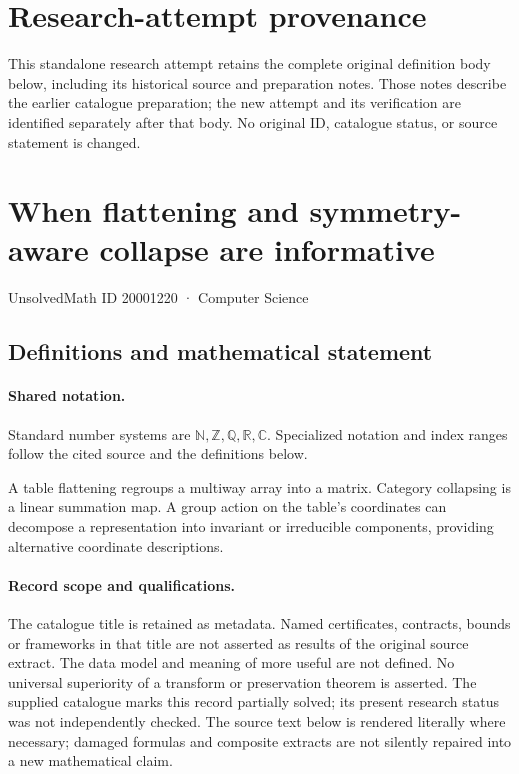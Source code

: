\documentclass[11pt]{article}
\begin{document}
\section*{Research-attempt provenance}
This standalone research attempt retains the complete original definition body below,
including its historical source and preparation notes. Those notes describe the
earlier catalogue preparation; the new attempt and its verification are identified
separately after that body. No original ID, catalogue status, or source statement is changed.

\section{When flattening and symmetry-aware collapse are informative}\label{20001220}
{\small UnsolvedMath ID 20001220 · Computer Science}
\subsection{Definitions and mathematical statement}

\paragraph{Shared notation.}Standard number systems are $\mathbb N,\mathbb Z,\mathbb Q,\mathbb R,\mathbb C$. Specialized notation and index ranges follow the cited source and the definitions below.


A table flattening regroups a multiway array into a matrix. Category collapsing is a linear summation map. A group action on the table's coordinates can decompose a representation into invariant or irreducible components, providing alternative coordinate descriptions.
\paragraph{Record scope and qualifications.}
The catalogue title is retained as metadata. Named certificates, contracts, bounds or frameworks in that title are not asserted as results of the original source extract.
The data model and meaning of more useful are not defined. No universal superiority of a transform or preservation theorem is asserted. The supplied catalogue marks this record partially solved; its present research status was not independently checked.
The source text below is rendered literally where necessary; damaged formulas and composite extracts are not silently repaired into a new mathematical claim.
\end{document}

